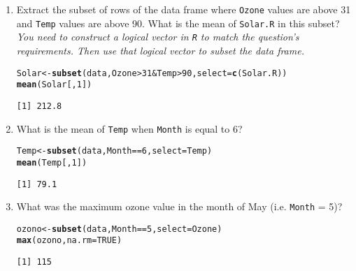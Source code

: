 \documentclass{article}\usepackage[]{graphicx}\usepackage[]{color}
\makeatletter
\newcommand{\hlnum}[1]{\textcolor[rgb]{0.686,0.059,0.569}{#1}}%
\newcommand{\hlopt}[1]{\textcolor[rgb]{0,0,0}{#1}}%
\newcommand{\hlstd}[1]{\textcolor[rgb]{0.345,0.345,0.345}{#1}}%
\newcommand{\hlkwb}[1]{\textcolor[rgb]{0.69,0.353,0.396}{#1}}%
\newcommand{\hlkwc}[1]{\textcolor[rgb]{0.333,0.667,0.333}{#1}}%
\newcommand{\hlkwd}[1]{\textcolor[rgb]{0.737,0.353,0.396}{\textbf{#1}}}%
\newenvironment{kframe}{%
 \def\at@end@of@kframe{}%
 \ifinner\ifhmode%
  \def\at@end@of@kframe{\end{minipage}}%
  \begin{minipage}{\columnwidth}%
 \fi\fi%
 \def\FrameCommand##1{\hskip\@totalleftmargin \hskip-\fboxsep
 \colorbox{shadecolor}{##1}\hskip-\fboxsep
     \hskip-\linewidth \hskip-\@totalleftmargin \hskip\columnwidth}%
 \MakeFramed {\advance\hsize-\width
   \@totalleftmargin\z@ \linewidth\hsize
   \@setminipage}}%
 {\par\unskip\endMakeFramed%
 \at@end@of@kframe}
\newenvironment{knitrout}{}{} %
\makeatother
\begin{document}
\begin{enumerate}
  \item Extract the subset of rows of the data frame where \texttt{Ozone} values are above 31 and \texttt{Temp} values are above 90. What is the mean of \texttt{Solar.R} in this subset?
  \emph{You need to construct a logical vector in \texttt{R} to match the question's requirements. Then use that logical vector to subset the data frame.}
\begin{knitrout}
\color{fgcolor}\begin{kframe}
\begin{alltt}
\hlstd{Solar} \hlkwb{<-} \hlkwd{subset}\hlstd{(data, Ozone} \hlopt{>} \hlnum{31} \hlopt{&} \hlstd{Temp} \hlopt{>} \hlnum{90}\hlstd{,} \hlkwc{select} \hlstd{=} \hlkwd{c}\hlstd{(Solar.R))}
\hlkwd{mean}\hlstd{(Solar[,}\hlnum{1}\hlstd{])}
\end{alltt}
\begin{verbatim}
[1] 212.8
\end{verbatim}
\end{kframe}
\end{knitrout}
    
  \item What is the mean of \texttt{Temp} when \texttt{Month} is equal to 6?
\begin{knitrout}
\color{fgcolor}\begin{kframe}
\begin{alltt}
\hlstd{Temp} \hlkwb{<-} \hlkwd{subset}\hlstd{(data, Month} \hlopt{==} \hlnum{6}\hlstd{,} \hlkwc{select} \hlstd{= Temp)}
\hlkwd{mean}\hlstd{(Temp[,}\hlnum{1}\hlstd{])}
\end{alltt}
\begin{verbatim}
[1] 79.1
\end{verbatim}
\end{kframe}
\end{knitrout}
  
  \item What was the maximum ozone value in the month of May (i.e. \texttt{Month} = 5)?
\begin{knitrout}
\color{fgcolor}\begin{kframe}
\begin{alltt}
\hlstd{ozono} \hlkwb{<-} \hlkwd{subset}\hlstd{(data, Month} \hlopt{==} \hlnum{5}\hlstd{,} \hlkwc{select} \hlstd{= Ozone)}
\hlkwd{max}\hlstd{(ozono,} \hlkwc{na.rm} \hlstd{=} \hlnum{TRUE}\hlstd{)}
\end{alltt}
\begin{verbatim}
[1] 115
\end{verbatim}
\end{kframe}
\end{knitrout}
    
\end{enumerate}
\end{document}
